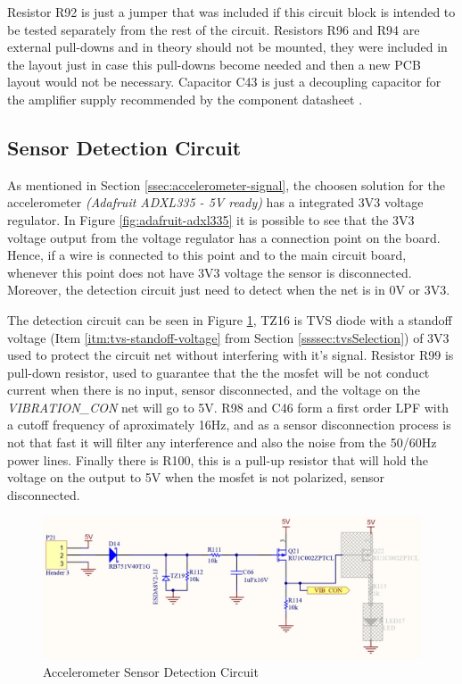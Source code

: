 	Resistor R92 is just a jumper that was included if this circuit block is intended to be tested separately from the rest of the circuit. Resistors R96 and R94 are external pull-downs and in theory should not be mounted, they were included in the layout just in case this pull-downs become needed and then a new PCB layout would not be necessary. Capacitor C43 is just a decoupling capacitor for the amplifier supply recommended by the component datasheet \cite{mcp6001-datasheet}.

\subsection{Sensor Detection Circuit}\label{ssec:accelerometer-sensor-detection-circuit}

	As mentioned in Section \ref{ssec:accelerometer-signal}, the choosen solution for the accelerometer \textit{(Adafruit ADXL335 - 5V ready)} has a integrated 3V3 voltage regulator. In Figure \ref{fig:adafruit-adxl335} it is possible to see that the 3V3 voltage output from the voltage regulator has a connection point on the board. Hence, if a wire is connected to this point and to the main circuit board, whenever this point does not have 3V3 voltage the sensor is disconnected. Moreover, the detection circuit just need to detect when the net is in 0V or 3V3.
	\par
	The detection circuit can be seen in Figure \ref{fig:accelerometer-sensor-detection-circuit}, TZ16 is TVS diode with a standoff voltage (Item \ref{itm:tvs-standoff-voltage} from Section \ref{ssssec:tvsSelection}) of 3V3 used to protect the circuit net without interfering with it's signal. Resistor R99 is pull-down resistor, used to guarantee that the the mosfet will be not conduct current when there is no input, sensor disconnected, and the voltage on the \textit{VIBRATION_CON} net will go to 5V. R98 and C46 form a first order LPF with a cutoff frequency of aproximately 16Hz, and as a sensor disconnection process is not that fast it will filter any interference and also the noise from the 50/60Hz power lines. Finally there is R100, this is a pull-up resistor that will hold the voltage on the output to 5V when the mosfet is not polarized, sensor disconnected.

	\begin{figure}[htbp]
		\centering
			\includegraphics[scale=0.95]{figuras/fig-accelerometer-sensor-detection-circuit.jpg}
		\caption{Accelerometer Sensor Detection Circuit \cite{accelerometer-sensor-detection-circuit}}
		\label{fig:accelerometer-sensor-detection-circuit}
	\end{figure}